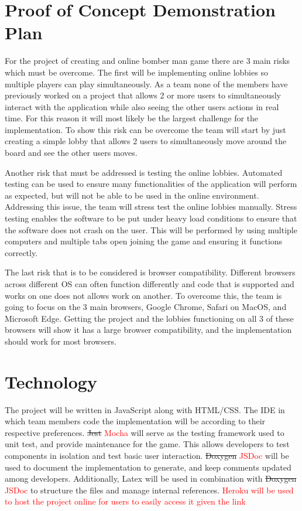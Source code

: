 \documentclass{article}
\begin{document}
\section{Proof of Concept Demonstration Plan}

For the project of creating and online bomber man game there are 3 main risks which must be overcome. The first will be implementing online lobbies so multiple players can play simultaneously. As a team none of the members have previously worked on a project that allows 2 or more users to simultaneously interact with the application while also seeing the other users actions in real time. For this reason it will most likely be the largest challenge for the implementation. To show this risk can be overcome the team will start by just creating a simple lobby that allows 2 users to simultaneously move around the board and see the other users moves.

Another risk that must be addressed is testing the online lobbies. Automated testing can be used to ensure many functionalities of the application will perform as expected, but will not be able to be used in the online environment. Addressing this issue, the team will stress test the online lobbies manually. Stress testing enables the software to be put under heavy load conditions to ensure that the software does not crash on the user. This will be performed by using multiple computers and multiple tabs open joining the game and ensuring it functions correctly.

The last risk that is to be considered is browser compatibility. Different browsers across different OS can often function differently and code that is supported and works on one does not allows work on another. To overcome this, the team is going to focus on the 3 main browsers, Google Chrome, Safari on MacOS, and Microsoft Edge. Getting the project and the lobbies functioning on all 3 of these browsers will show it has a large browser compatibility, and the implementation should work for most browsers.
 

\section{Technology}


The project will be written in JavaScript along with HTML/CSS. The IDE in which
team members code the implementation will be according to their respective preferences. \st{Jest} \textcolor{red}{Mocha} will serve as the testing framework used to unit test, and provide maintenance for the game. This allows developers to test components in isolation and test basic user interaction. \st{Doxygen} \textcolor{red}{JSDoc} will be used to document the implementation to generate, and keep comments updated among developers. Additionally, Latex will be used in combination with \st{Doxygen} \textcolor{red}{JSDoc} to structure the files and manage internal references. \textcolor{red}{Heroku will be used to host the project online for users to easily access it given the link}
\end{document}
